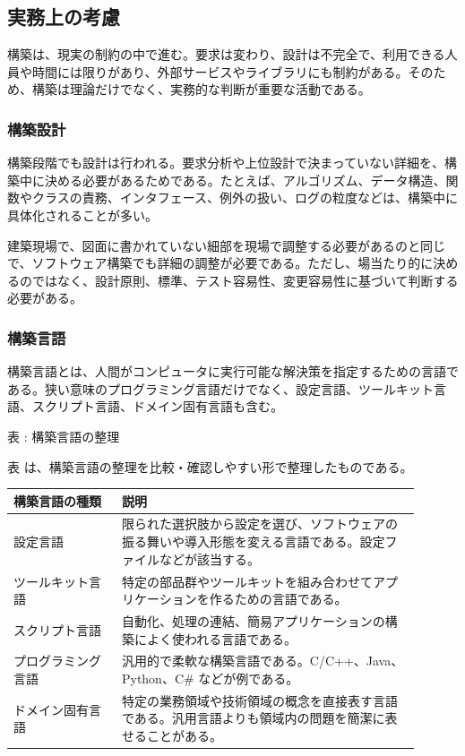 \subsection{実務上の考慮}

構築は、現実の制約の中で進む。要求は変わり、設計は不完全で、利用できる人員や時間には限りがあり、外部サービスやライブラリにも制約がある。そのため、構築は理論だけでなく、実務的な判断が重要な活動である。

\subsubsection{構築設計}

構築段階でも設計は行われる。要求分析や上位設計で決まっていない詳細を、構築中に決める必要があるためである。たとえば、アルゴリズム、データ構造、関数やクラスの責務、インタフェース、例外の扱い、ログの粒度などは、構築中に具体化されることが多い。

建築現場で、図面に書かれていない細部を現場で調整する必要があるのと同じで、ソフトウェア構築でも詳細の調整が必要である。ただし、場当たり的に決めるのではなく、設計原則、標準、テスト容易性、変更容易性に基づいて判断する必要がある。

\subsubsection{構築言語}

構築言語とは、人間がコンピュータに実行可能な解決策を指定するための言語である。狭い意味のプログラミング言語だけでなく、設定言語、ツールキット言語、スクリプト言語、ドメイン固有言語も含む。

\par\smallskip\noindent{}\label{tab:ch04-03}表 \thetable: 構築言語の整理\par\smallskip
表 \thetable は、構築言語の整理を比較・確認しやすい形で整理したものである。\par\smallskip
\begin{longtable}{L{0.24\linewidth}L{0.66\linewidth}}
\toprule
構築言語の種類 & 説明 \\
\midrule
設定言語 & 限られた選択肢から設定を選び、ソフトウェアの振る舞いや導入形態を変える言語である。設定ファイルなどが該当する。 \\
ツールキット言語 & 特定の部品群やツールキットを組み合わせてアプリケーションを作るための言語である。 \\
スクリプト言語 & 自動化、処理の連結、簡易アプリケーションの構築によく使われる言語である。 \\
プログラミング言語 & 汎用的で柔軟な構築言語である。C/C++、Java、Python、C\# などが例である。 \\
ドメイン固有言語 & 特定の業務領域や技術領域の概念を直接表す言語である。汎用言語よりも領域内の問題を簡潔に表せることがある。 \\
\bottomrule
\end{longtable}

